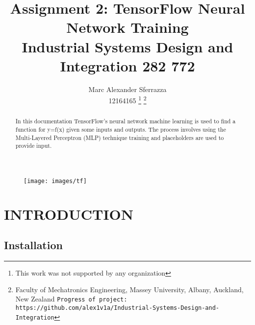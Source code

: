 \documentclass[a4paper, 10pt]{IEEEconf}
\title{\LARGE \bf Assignment 2: TensorFlow Neural Network Training\\Industrial Systems Design and Integration 282 772}
\author{Marc Alexander Sferrazza \\ 12164165
\thanks{This work was not supported by any organization}
\thanks{Faculty of Mechatronics Engineering, Massey University, Albany, Auckland, New Zealand
        {\tt\small Progress of project: https://github.com/alex1v1a/Industrial-Systems-Design-and-Integration} } }
\begin{document}
\maketitle
\begin{figure}[H]
  \begin{center}
  \texttt{[image: images/tf]}
  \label{fig:kinetic}
  \end{center}
\end{figure}
\thispagestyle{empty}
\pagestyle{plain}



\begin{abstract}
In this documentation TensorFlow's neural network machine learning is used to find a function for y=f(x) given some inputs and outputs. The process involves using the Multi-Layered Perceptron (MLP) technique training and placeholders are used to provide input.
\end{abstract}


\clearpage
\thispagestyle{empty}
\tableofcontents
\begingroup
\let\clearpage\relax
\listoffigures
\endgroup
\clearpage
\twocolumn

\clearpage
\setcounter{page}{1}
\onecolumn

\section{INTRODUCTION}





\subsection{Installation}
\end{document}
